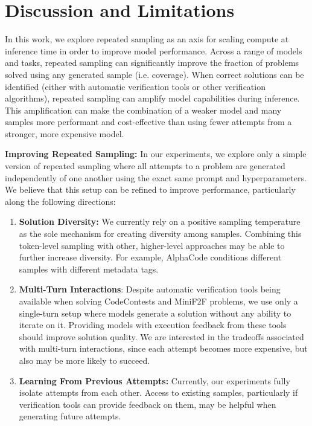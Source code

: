 \documentclass[11pt]{article}
\begin{document}
\section{Discussion and Limitations}
\label{sec:discussion}

In this work, we explore repeated sampling as an axis for scaling compute at inference time in order to improve model performance. Across a range of models and tasks, repeated sampling can significantly improve the fraction of problems solved using any generated sample (i.e. coverage). When correct solutions can be identified (either with automatic verification tools or other verification algorithms), repeated sampling can amplify model capabilities during inference. This amplification can make the combination of a weaker model and many samples more performant and cost-effective than using fewer attempts from a stronger, more expensive model.

\;

\noindent \textbf{Improving Repeated Sampling:} In our experiments, we explore only a simple version of repeated sampling where all attempts to a problem are generated independently of one another using the exact same prompt and hyperparameters. We believe that this setup can be refined to improve performance, particularly along the following directions: 

\begin{enumerate}
    \item \textbf{Solution Diversity:} We currently rely on a positive sampling temperature as the sole mechanism for creating diversity among samples. Combining this token-level sampling with other, higher-level approaches may be able to further increase diversity. For example, AlphaCode conditions different samples with different metadata tags.

    \item \textbf{Multi-Turn Interactions}: Despite automatic verification tools being available when solving CodeContests and MiniF2F problems, we use only a single-turn setup where models generate a solution without any ability to iterate on it. Providing models with execution feedback from these tools should improve solution quality. We are interested in the tradeoffs associated with multi-turn interactions, since each attempt becomes more expensive, but also may be more likely to succeed.
    \item \textbf{Learning From Previous Attempts:} Currently, our experiments fully isolate attempts from each other. Access to existing samples, particularly if verification tools can provide feedback on them, may be helpful when generating future attempts.
\end{enumerate}
\end{document}
